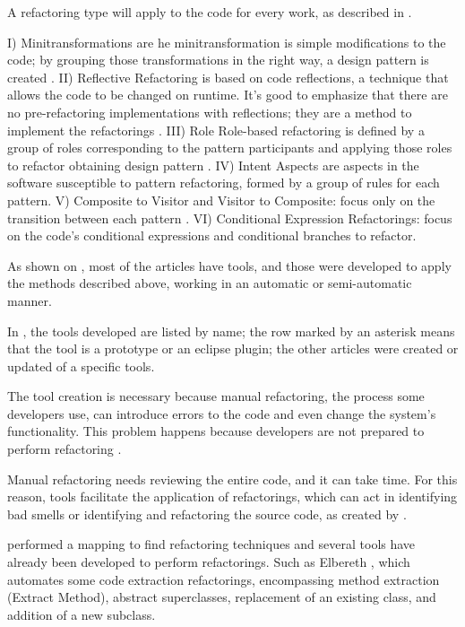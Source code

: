

A refactoring type will apply to the code for every work, as described in .

I) Minitransformations are he minitransformation is simple modifications to the code; by grouping those transformations in the right way, a design pattern is created \cite{cinneide2001automated}. II) Reflective Refactoring is based on code reflections, a technique that allows the code to be changed on runtime. It's good to emphasize that there are no pre-refactoring implementations with reflections; they are a method to implement the refactorings \cite{beluzzo2018abordagem}. III) Role Role-based refactoring is defined by a group of roles corresponding to the pattern participants and applying those roles to refactor obtaining design pattern \cite{mens972774}. IV) Intent Aspects are aspects in the software susceptible to pattern refactoring, formed by a group of rules for each pattern\cite{ram2004detecting}. V) Composite to Visitor and Visitor to Composite: focus only on the transition between each pattern \cite{beluzzo2018abordagem}. VI) Conditional Expression Refactorings: focus on the code's conditional expressions and conditional branches to refactor. \cite{CHRISTOPOULOU20121201}

As shown on , most of the articles have tools, and those were developed to apply the methods described above, working in an automatic or semi-automatic manner.



In , the tools developed are listed by name; the row marked by an asterisk means that the tool is a prototype or an eclipse plugin; the other articles were created or updated of a specific tools\cite{beluzzo2018abordagem}.

The tool creation is necessary because manual refactoring, the process some developers use, can introduce errors to the code and even change the system's functionality. This problem happens because developers are not prepared to perform refactoring \cite{ge2012reconciling}.

Manual refactoring needs reviewing the entire code, and it can take time. For this reason, tools facilitate the application of refactorings, which can act in identifying bad smells or identifying and refactoring the source code, as created by \textcite{beluzzo2018abordagem}.

\textcite{beluzzo2018abordagem} performed a mapping to find refactoring techniques and several tools have already been developed to perform refactorings. Such as Elbereth \cite{korman1998elbereth}, which automates some code extraction refactorings, encompassing method extraction (Extract Method), abstract superclasses, replacement of an existing class, and addition of a new subclass.

